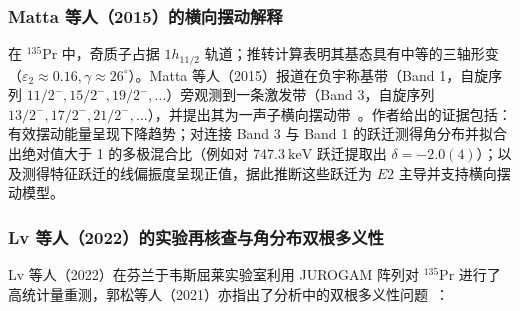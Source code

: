 \subsubsection{Matta 等人（2015）的横向摆动解释}

在 $^{135}\mathrm{Pr}$ 中，奇质子占据 $1h_{11/2}$ 轨道；推转计算表明其基态具有中等的三轴形变（$\varepsilon_2 \approx 0.16, \gamma \approx 26^\circ$）。Matta 等人（2015）报道在负宇称基带（Band 1，自旋序列 $11/2^-, 15/2^-, 19/2^-, \dots$）旁观测到一条激发带（Band 3，自旋序列 $13/2^-, 17/2^-, 21/2^-, \dots$），并提出其为一声子横向摆动带~\cite{matta-2015-transverse-wobbling-135pr}。作者给出的证据包括：有效摆动能量呈现下降趋势；对连接 Band 3 与 Band 1 的跃迁测得角分布并拟合出绝对值大于 1 的多极混合比（例如对 $747.3\ \mathrm{keV}$ 跃迁提取出 $\delta = -2.0(4)$）；以及测得特征跃迁的线偏振度呈现正值，据此推断这些跃迁为 $E2$ 主导并支持横向摆动模型。

\subsubsection{Lv 等人（2022）的实验再核查与角分布双根多义性}

Lv 等人（2022）在芬兰于韦斯屈莱实验室利用 JUROGAM 阵列对 $^{135}\mathrm{Pr}$ 进行了高统计量重测，郭松等人（2021）亦指出了分析中的双根多义性问题~\cite{lv-2022-evidence-against-wobbling-135pr,guo-2021-comment-transverse-wobbling-135pr}：


